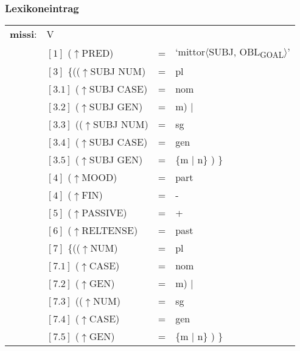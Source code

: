 \documentclass[12pt,a4paper]{article}
\begin{document}
\subsubsection{Lexikoneintrag}
\begin{singlespace}
\begin{tabular}{ l  l  l  l  } 
\textbf{missi}: & V \\
$\qquad$ & $[1]$ \:  ($\uparrow$PRED) & = & `mittor$\langle$SUBJ, OBL\textsubscript{GOAL}$\rangle$'\\
$\qquad$ & $[3]$ \:  \{(($\uparrow$SUBJ NUM) & = & pl \\ 
$\qquad$ & $[3.1]$ \:  ($\uparrow$SUBJ CASE) & = & nom \\
$\qquad$ & $[3.2]$ \:  ($\uparrow$SUBJ GEN) & = & m) $\mid$\\
$\qquad$ & $[3.3]$ \:  (($\uparrow$SUBJ NUM) & = & sg \\ 
$\qquad$ & $[3.4]$ \: ($\uparrow$SUBJ CASE) & = & gen \\
$\qquad$ & $[3.5]$ \:  ($\uparrow$SUBJ GEN) & = & \{m $\mid$ n\} ) \} \\
$\qquad$ & $[4]$ \:  ($\uparrow$MOOD) & = & part \\
$\qquad$ & $[4]$ \:  ($\uparrow$FIN) & = & - \\
$\qquad$ & $[5]$ \:  ($\uparrow$PASSIVE) & = & + \\
$\qquad$ & $[6]$ \: ($\uparrow$RELTENSE) & = & past \\
$\qquad$ & $[7]$ \:  \{(($\uparrow$NUM) & = & pl \\ 
$\qquad$ & $[7.1]$ \:  ($\uparrow$CASE) & = & nom \\
$\qquad$ & $[7.2]$ \:  ($\uparrow$GEN) & = & m) $\mid$\\
$\qquad$ & $[7.3]$ \:  (($\uparrow$NUM) & = & sg \\ 
$\qquad$ & $[7.4]$ \: ($\uparrow$CASE) & = & gen \\
$\qquad$ & $[7.5]$ \:  ($\uparrow$GEN) & = & \{m $\mid$ n\} ) \} \\
\end{tabular}
\end{singlespace}
\end{document}
